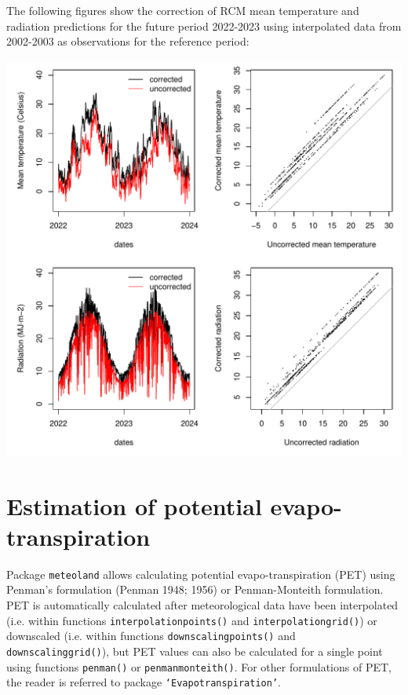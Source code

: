 \documentclass[11pt,a4paper]{article}
\begin{document}
The following figures show the correction of RCM mean temperature and radiation predictions for the future period 2022-2023 using interpolated data from 2002-2003 as observations for the reference period:
\begin{center}
\includegraphics{Meteorology-030}
\end{center}



\section{Estimation of potential evapo-transpiration}
Package \texttt{meteoland} allows calculating potential evapo-transpiration (PET) using Penman's formulation (Penman 1948; 1956) or Penman-Monteith formulation. PET is automatically calculated after meteorological data have been interpolated (i.e. within functions \texttt{interpolationpoints()} and \texttt{interpolationgrid()}) or downscaled (i.e. within functions \texttt{downscalingpoints()} and \texttt{downscalinggrid()}), but PET values can also be calculated for a single point using functions \texttt{penman()} or \texttt{penmanmonteith()}. For other formulations of PET, the reader is referred to package \texttt{`Evapotranspiration'}.
\end{document}

